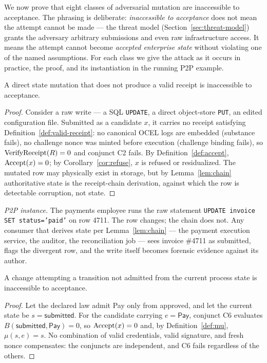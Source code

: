 We now prove that eight classes of adversarial mutation are inaccessible to
acceptance. The phrasing is deliberate: \emph{inaccessible to acceptance} does
not mean the attempt cannot be made --- the threat model
(Section~\ref{sec:threat-model}) grants the adversary arbitrary submissions and
even raw infrastructure access. It means the attempt cannot become
\emph{accepted enterprise state} without violating one of the named assumptions.
For each class we give the attack as it occurs in practice, the proof, and its
instantiation in the running P2P example.

\begin{proposition}
\label{prop:raw}
A direct state mutation that does not produce a valid receipt is inaccessible
to acceptance.
\end{proposition}
\begin{proof}
Consider a raw write --- a SQL \texttt{UPDATE}, a direct object-store \texttt{PUT},
an edited configuration file. Submitted as a candidate $x$, it carries no
receipt satisfying Definition~\ref{def:valid-receipt}: no canonical OCEL logs
are embedded (substance fails), no challenge nonce was minted before execution
(challenge binding fails), so $\operatorname{VerifyReceipt}(R) = 0$ and conjunct C2 fails.
By Definition~\ref{def:accept}, $\operatorname{Accept}(x) = 0$; by
Corollary~\ref{cor:refuse}, $x$ is refused or residualized. The mutated row may
physically exist in storage, but by Lemma~\ref{lem:chain} authoritative state
is the receipt-chain derivation, against which the row is detectable
corruption, not state.
\end{proof}

\emph{P2P instance.} The payments employee runs the raw statement
\texttt{UPDATE invoice SET status='paid'} on row 4711. The row changes; the
chain does not. Any consumer that derives state per Lemma~\ref{lem:chain} ---
the payment execution service, the auditor, the reconciliation job --- sees
invoice \#4711 as \textsf{submitted}, flags the divergent row, and the write
itself becomes forensic evidence against its author.

\begin{proposition}
\label{prop:skip}
A change attempting a transition not admitted from the current process state is
inaccessible to acceptance.
\end{proposition}
\begin{proof}
Let the declared law admit \textsf{Pay} only from \textsf{approved}, and let
the current state be $s = \textsf{submitted}$. For the candidate carrying
$e = \textsf{Pay}$, conjunct C6 evaluates $B(\textsf{submitted}, \textsf{Pay})
= 0$, so $\operatorname{Accept}(x) = 0$ and, by Definition~\ref{def:mu},
$\mu(s, e) = s$. No combination of valid credentials, valid signature, and
fresh nonce compensates: the conjuncts are independent, and C6 fails regardless
of the others.
\end{proof}


